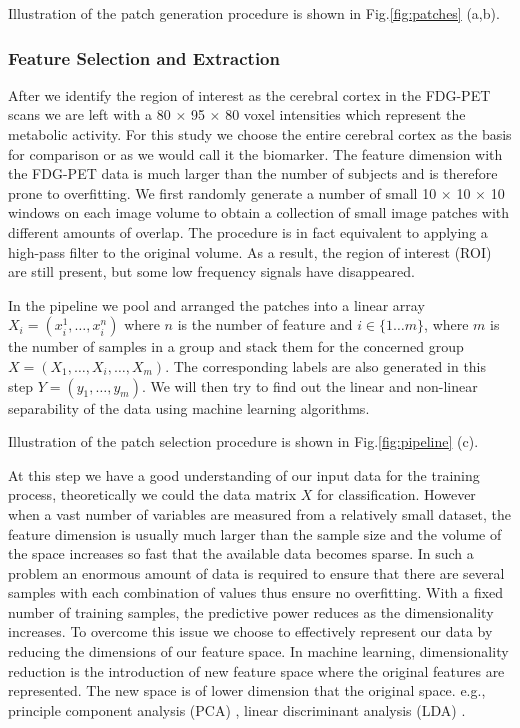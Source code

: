 \documentclass[authoryear,preprint,revi	ew,12pt]{elsarticle}
\begin{document}
Illustration of the patch generation procedure is shown in Fig.\ref{fig:patches} (a,b). 

\subsubsection{Feature Selection and Extraction}
\label{sec:pipline}
After we identify the region of interest as the cerebral cortex in the FDG-PET scans we are left with a 80 $ \times $ 95 $ \times $ 80 voxel intensities which represent the metabolic activity. For this study we choose the entire cerebral cortex as the basis for comparison or as we would call it the biomarker. The feature dimension with the FDG-PET data is much larger than the number of subjects and is therefore prone to overfitting. We first randomly generate a number of small 10 $ \times $ 10 $ \times $ 10 windows on each image volume to obtain a collection of small image patches with different amounts of overlap. The procedure is in fact equivalent to applying a high-pass filter to the original volume. As a result, the region of interest (ROI) are still present, but some low frequency signals have disappeared. 

In the pipeline we pool and arranged the patches into a linear array $ X_i = (x^1_i,\dots,x^n_i) $ where $ n $ is the number of feature and $ i \in \{1 \dots m\} $, where $ m $ is the number of samples in a group and stack them for the concerned group $ X = (X_1,\dots,X_i,\dots,X_m) $. The corresponding labels are also generated in this step $ Y = (y_1,\dots,y_m) $. We will then try to find out the linear and non-linear separability of the data using machine learning algorithms.

Illustration of the patch selection procedure is shown in Fig.\ref{fig:pipeline} (c).

At this step we have a good understanding of our input data for the training process, theoretically we could the data matrix $ X $ for classification. However when a vast number of variables are measured from a relatively small dataset, the feature dimension is usually much larger than the sample size and the volume of the space increases so fast that the available data becomes sparse. In such a problem an enormous amount of data is required to ensure that there are several samples with each combination of values thus ensure no overfitting. With a fixed number of training samples, the predictive power reduces as the dimensionality increases. To overcome this issue we choose to effectively represent our data by reducing the dimensions of our feature space. In machine learning, dimensionality reduction is the introduction of new feature space where the original features are represented. The new space is of lower dimension that the original space. e.g., principle component analysis (PCA) \citep{jolliffe2002principal}, linear discriminant analysis (LDA) \citep{mika1999fisher}.
\end{document}
